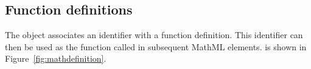 


\subsection{Function definitions}
\label{sec:functiondefinition}

The \FunctionDefinition object associates an identifier with a
function definition.  This identifier can then be used as the
function called in subsequent MathML  elements.
\FunctionDefinition is shown in Figure~\ref{fig:mathdefinition}.

